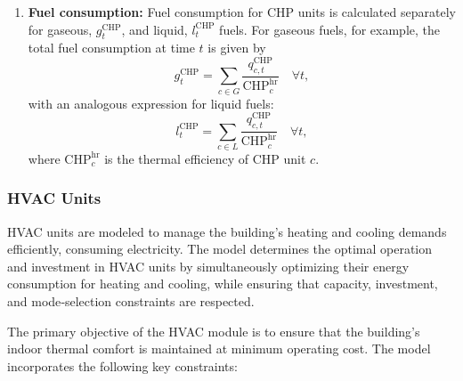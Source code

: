 \documentclass[11pt]{article}
\begin{document}
\begin{enumerate}
    where the index \(l\) distinguishes between the two types of thermal output: \(l=1\) represents hot air (used for space heating) and \(l=2\) represents hot water. The variable \(q^\text{CHP-BDG}_{c,l,t}\) denotes the amount of heat provided by CHP unit \(c\) at time \(t\) directly to the building for the respective application, as indicated by \((c,l\) In contrast, the term \(\sum_{a=1}^{\text{N}^\text{ABS}} q^\text{CHP-ABS}_{c,a,t}\) indicates the portion of heat production allocated to chiller operation, as denoted by \((c,a)\).
    
    For units operating as boilers, with \(\text{CHP}^\text{h2p}_c = 0\), the available heat is bounded by the unit's operational status:
    \[
    \sum_{l=1}^{2} q^\text{CHP-BDG}_{c,l,t} + \sum_{a=1}^{\text{N}^\text{ABS}} q^\text{CHP-ABS}_{c,a,t} \leq \text{CHP}^\text{mx}_c \cdot u^\text{CHP}_{c,t} \quad \forall c,t \text{ with } \text{CHP}^\text{h2p}_c = 0.
    \]

    \item \textbf{Fuel consumption:}
    Fuel consumption for CHP units is calculated separately for gaseous, \(g^\text{CHP}_{t}\), and liquid, \(l^\text{CHP}_{t}\) fuels. For gaseous fuels, for example, the total fuel consumption at time \(t\) is given by
    \[
    g^\text{CHP}_{t} = \sum_{c \in G} \frac{q^\text{CHP}_{c,t}}{\text{CHP}^\text{hr}_c} \quad \forall t,
    \]
    with an analogous expression for liquid fuels:
    \[
    l^\text{CHP}_{t} = \sum_{c \in L} \frac{q^\text{CHP}_{c,t}}{\text{CHP}^\text{hr}_c} \quad \forall t,
    \]
    where \(\text{CHP}^\text{hr}_c\) is the thermal efficiency of CHP unit \(c\).
    
\end{enumerate}

\subsubsection{HVAC Units}
\label{sec:hvac}

HVAC units are modeled to manage the building’s heating and cooling demands efficiently, consuming electricity. The model determines the optimal operation and investment in HVAC units by simultaneously optimizing their energy consumption for heating and cooling, while ensuring that capacity, investment, and mode‐selection constraints are respected.

The primary objective of the HVAC module is to ensure that the building’s indoor thermal comfort is maintained at minimum operating cost. The model incorporates the following key constraints:
\end{document}
